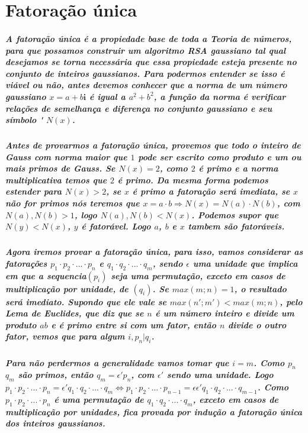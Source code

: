 \section{Fatora\c{c}\~ao \'unica}
\subparagraph{
A fatora\c{c}\~ao \'unica \'e a propiedade base de toda a Teoria de n\'umeros, para que possamos construir um algoritmo RSA gaussiano tal qual desejamos se torna necess\'aria que essa propiedade esteja presente no conjunto de inteiros gaussianos. Para podermos entender se isso \'e vi\'avel ou n\~ao, antes devemos conhecer que a \textit{norma} de um n\'umero gaussiano $x=a+b\textbf{i}$ \'e igual a $a^2 + b^2$, a fun\c{c}\~ao da norma \'e verificar rela\c{c}\~oes de semelhan\c{c}a e diferen\c{c}a no conjunto gaussiano e seu s\'imbolo \' $N(x)$.
}
\subparagraph{
Antes de provarmos a fatora\c{c}\~ao \'unica, provemos que todo o inteiro de Gauss com norma maior que $1$ pode ser escrito como produto e um ou mais primos de Gauss. Se $N(x)=2$, como $2$ \'e primo e a norma multiplicativa temos que $2$ \'e primo. Da mesma forma podemos estender para $N(x)>2$, se $x$ \'e primo a fatora\c{c}\~ao ser\'a imediata, se $x$ n\~ao for primos n\'os teremos que $x=a \cdot b \Rightarrow N(x) = N(a) \cdot N(b)$, com $ N(a), N(b) > 1$, logo $ N(a), N(b) < N(x)$. Podemos supor que $N(y) < N(x)$, $y$ \'e fator\'avel. Logo $a$, $b$ e $x$ tambem s\~ao fator\'aveis.
}
\subparagraph{
Agora iremos provar a fatora\c{c}\~ao \'unica, para isso, vamos considerar as fatora\c{c}\~oes $p_1 \cdot p_2 \cdot ... \cdot p_n$ e $q_1 \cdot q_2 \cdot ... \cdot q_m$, sendo $\epsilon$  uma unidade que implica em que a sequencia$(p_i)$ seja uma permuta\c{c}\~ao, exceto em casos de multiplica\c{c}\~ao por unidade, de $(q_i)$. Se $max(m;n) = 1$, o resultado ser\'a imediato. Supondo que ele vale se $max(n';m') < max(m;n)$, pelo Lema de Euclides, que diz que se $n$ \'e um n\'umero inteiro e divide um produto $ab$ e \'e primo entre si com um fator, ent\~ao $n$ divide o outro fator, vemos que para algum $i, p_n| q_i$.
}
\subparagraph{
Para n\~ao perdermos a generalidade vamos tomar que $i=m$. Como $p_n$  $q_m$ s\~ao primos, ent\~ao $q_m = \epsilon' p_n$, com $\epsilon'$ sendo uma unidade. Logo $p_1 \cdot p_2 \cdot ... \cdot p_n = \epsilon'q_1 \cdot q_2 \cdot ... \cdot q_m \Leftrightarrow p_1 \cdot p_2 \cdot ... \cdot p_{n-1} = \epsilon\epsilon'q_1 \cdot q_2 \cdot ... \cdot q_{m-1} $. Como $p_1 \cdot p_2 \cdot ... \cdot p_n$ \'e uma permuta\c{c}\~ao de $q_1 \cdot q_2 \cdot ... \cdot q_m$, exceto em casos de multiplica\c{c}\~ao por unidades, fica provada por indu\c{c}\~ao a fatora\c{c}\~ao \'unica dos inteiros gaussianos.
}
